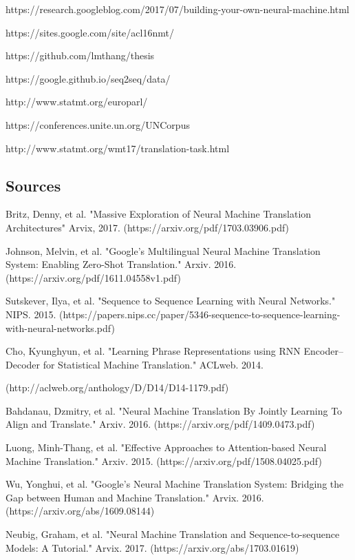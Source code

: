 \documentclass[10pt,a4paper]{article}
\begin{document}
https://research.googleblog.com/2017/07/building-your-own-neural-machine.html

https://sites.google.com/site/acl16nmt/

https://github.com/lmthang/thesis

https://google.github.io/seq2seq/data/

http://www.statmt.org/europarl/

https://conferences.unite.un.org/UNCorpus

http://www.statmt.org/wmt17/translation-task.html


\subsection{Sources}


Britz, Denny, et al. "Massive Exploration of Neural Machine Translation Architectures" Arvix, 2017.
(https://arxiv.org/pdf/1703.03906.pdf)
\newline

Johnson, Melvin, et al. "Google’s Multilingual Neural Machine Translation System: Enabling Zero-Shot Translation." Arxiv. 2016.
(https://arxiv.org/pdf/1611.04558v1.pdf)
\newline

Sutskever, Ilya, et al. "Sequence to Sequence Learning with Neural Networks." NIPS. 2015.
(https://papers.nips.cc/paper/5346-sequence-to-sequence-learning-with-neural-networks.pdf)
\newline

Cho, Kyunghyun, et al. "Learning Phrase Representations using RNN Encoder–Decoder for Statistical Machine Translation." ACLweb. 2014.

(http://aclweb.org/anthology/D/D14/D14-1179.pdf)
\newline

Bahdanau, Dzmitry, et al. "Neural Machine Translation By Jointly Learning To Align and Translate." Arxiv. 2016.
(https://arxiv.org/pdf/1409.0473.pdf)
\newline

Luong, Minh-Thang, et al. "Effective Approaches to Attention-based Neural Machine Translation." Arxiv. 2015.
(https://arxiv.org/pdf/1508.04025.pdf)
\newline

Wu, Yonghui, et al. "Google’s Neural Machine Translation System: Bridging the Gap between Human and Machine Translation." Arvix. 2016.
(https://arxiv.org/abs/1609.08144)
\newline

Neubig, Graham, et al. "Neural Machine Translation and Sequence-to-sequence Models: A Tutorial." Arvix. 2017.
(https://arxiv.org/abs/1703.01619)
\newline
\end{document}
